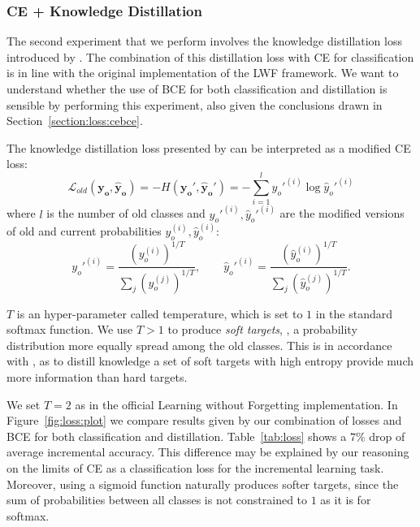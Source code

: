 \documentclass[10pt,twocolumn,letterpaper]{article}
\begin{document}
\subsubsection{CE + Knowledge Distillation}
The second experiment that we perform involves the knowledge distillation loss introduced by \cite{hinton:2015}. The combination of this distillation loss with CE for classification is in line with the original implementation of the LWF framework. We want to understand whether the use of BCE for both classification and distillation is sensible by performing this experiment, also given the conclusions drawn in Section~\ref{section:loss:cebce}.

The knowledge distillation loss presented by \cite{hinton:2015} can be interpreted as a modified CE loss:
\begin{equation}
    \mathcal{L}_{old}(\bm{y_{o}}, \bm{\hat{y}_{o}})=-H(\bm{y_{o}}', \bm{\hat{y}_{o}}')=-\sum_{i=1}^{l} y_{o}'^{(i)} \log{\hat{y}_{o}'^{(i)}} \label{eq:loss:cebce}
\end{equation}
where $l$ is the number of old classes and $y_{o}'^{(i)}, \hat{y}_{o}'^{(i)}$ are the modified versions of old and current probabilities $y_{o}^{(i)}, \hat{y}_{o}^{(i)}$:
\begin{equation}
    y_{o}'^{(i)}=\frac{(y_{o}^{(i)})^{1/T}}{\sum_{j} (y_{o}^{(j)})^{1/T}}, \qquad \hat{y}_{o}'^{(i)}=\frac{(\hat{y}_{o}^{(i)})^{1/T}}{\sum_{j} (\hat{y}_{o}^{(j)})^{1/T}}. \label{eq:loss:cebce2}
\end{equation}

$T$ is an hyper-parameter called temperature, which is set to $1$ in the standard softmax function. We use $T > 1$ to produce \emph{soft targets}, \ie, a probability distribution more equally spread among the old classes. This is in accordance with \cite{hinton:2015}, as to distill knowledge a set of soft targets with high entropy provide much more information than hard targets.

We set $T = 2$ as in the official Learning without Forgetting implementation. In Figure~\ref{fig:loss:plot} we compare results given by our combination of losses and BCE for both classification and distillation. Table~\ref{tab:loss} shows a $7\%$ drop of average incremental accuracy. This difference may be explained by our reasoning on the limits of CE as a classification loss for the incremental learning task. Moreover, using a sigmoid function naturally produces softer targets, since the sum of probabilities between all classes is not constrained to $1$ as it is for softmax.
\end{document}
